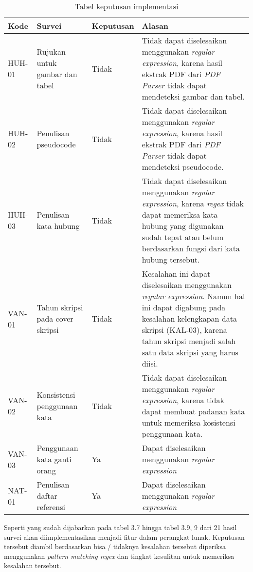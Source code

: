 \begin{table}[H]
	\caption {Tabel keputusan implementasi} \label{tab:keputusan}
	\begin{center}
		\begin{tabular}{|p{1.5 cm}|>{\raggedright} p{4 cm}| p{2 cm}| p{7 cm}|}
		\hline
		Kode & Survei & Keputusan & Alasan \\ 
		\hline
		HUH-01 & Rujukan untuk gambar dan tabel & Tidak & Tidak dapat diselesaikan menggunakan \textit{regular expression}, karena hasil ekstrak PDF dari \textit{PDF Parser} tidak dapat mendeteksi gambar dan tabel. \newline \\ 
		\hline 
		HUH-02 & Penulisan pseudocode & Tidak & Tidak dapat diselesaikan menggunakan \textit{regular expression}, karena hasil ekstrak PDF dari \textit{PDF Parser} tidak dapat mendeteksi pseudocode. \newline \\ 
		\hline 
		HUH-03 & Penulisan kata hubung & Tidak & Tidak dapat diselesaikan menggunakan \textit{regular expression}, karena \textit{regex} tidak dapat memeriksa kata hubung yang digunakan sudah tepat atau belum berdasarkan fungsi dari kata hubung tersebut. \newline \\ 
		\hline 
		VAN-01 & Tahun skripsi pada cover skripsi & Tidak & Kesalahan ini dapat diselesaikan menggunakan \textit{regular expression}. Namun hal ini dapat digabung pada kesalahan kelengkapan data skripsi (KAL-03), karena tahun skripsi menjadi salah satu data skripsi yang harus diisi. \newline \\ 
		\hline 
		VAN-02 & Konsistensi penggunaan kata & Tidak & Tidak dapat diselesaikan menggunakan \textit{regular expression}, karena \newline tidak dapat membuat padanan kata untuk memeriksa kosistensi penggunaan kata. \\ 
		\hline 
		VAN-03 & Penggunaan kata ganti orang & Ya & Dapat diselesaikan menggunakan \textit{regular expression} \newline \\ 
		\hline 
		NAT-01 & Penulisan daftar referensi & Ya & Dapat diselesaikan menggunakan \textit{regular expression} \newline \\ 
		\hline
		\end{tabular}
	\end{center}
\end{table}

Seperti yang sudah dijabarkan pada tabel 3.7 hingga tabel 3.9, 9 dari 21 hasil survei akan diimplementasikan menjadi fitur dalam perangkat lunak. Keputusan tersebut diambil berdasarkan bisa / tidaknya kesalahan tersebut diperiksa menggunakan \textit{pattern matching regex} dan tingkat kesulitan untuk memeriksa kesalahan tersebut.
